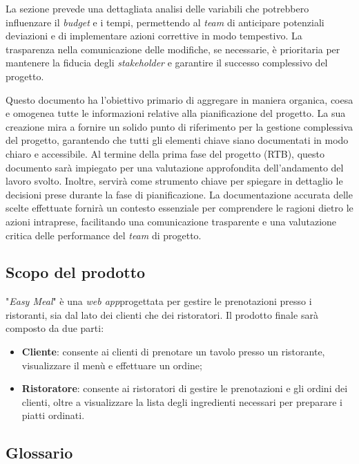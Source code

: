 \begin{itemize}
	      La sezione prevede una dettagliata analisi delle variabili che potrebbero influenzare
	      il \textit{budget} e i tempi, permettendo al \textit{team} di anticipare potenziali deviazioni e di
	      implementare azioni correttive in modo tempestivo. La trasparenza nella comunicazione
	      delle modifiche, se necessarie, è prioritaria per mantenere la fiducia degli \textit{stakeholder}
	      e garantire il successo complessivo del progetto.
\end{itemize}
Questo documento ha l'obiettivo primario di aggregare in maniera organica, coesa e
omogenea tutte le informazioni relative alla pianificazione del progetto.
La sua creazione mira a fornire un solido punto di riferimento per la gestione complessiva del progetto,
garantendo che tutti gli elementi chiave siano documentati in modo chiaro e accessibile.
\newline
Al termine della prima fase del progetto (RTB), questo documento sarà impiegato per una valutazione
approfondita dell'andamento del lavoro svolto. Inoltre, servirà come strumento chiave per spiegare
in dettaglio le decisioni prese durante la fase di pianificazione.
La documentazione accurata delle scelte effettuate fornirà un contesto essenziale per comprendere
le ragioni dietro le azioni intraprese, facilitando una comunicazione trasparente e una
valutazione critica delle performance del \textit{team} di progetto.

\subsection{Scopo del prodotto}

"\textit{Easy Meal}" è una \textit{web app}\g progettata per gestire le
prenotazioni presso i ristoranti, sia dal lato dei clienti che dei ristoratori.
Il prodotto finale sarà composto da due parti:

\begin{itemize}
	\item \textbf{Cliente\g}: consente ai clienti di prenotare un tavolo presso un
	      ristorante, visualizzare il menù e effettuare un ordine\g;

	\item \textbf{Ristoratore}: consente ai ristoratori di gestire le
	      prenotazioni e gli ordini dei clienti, oltre a visualizzare la lista
	      degli ingredienti necessari per preparare i piatti ordinati.
\end{itemize}

\subsection{Glossario}

